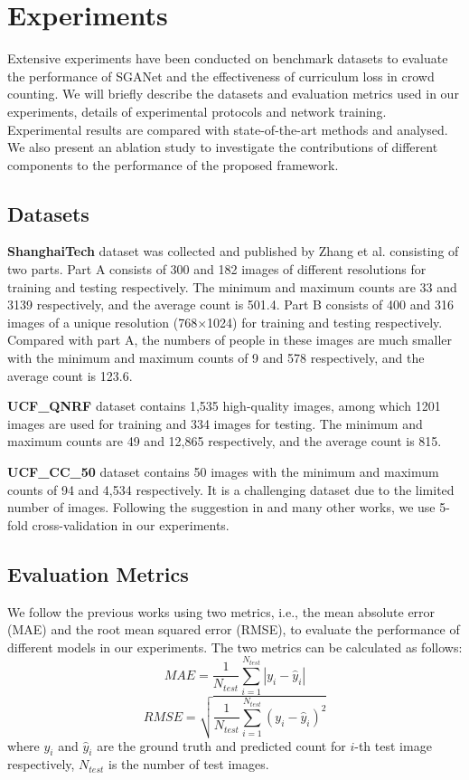 \documentclass[journal,comsoc]{IEEEtran}
\begin{document}
\section{Experiments}\label{sec:experiments}
Extensive experiments have been conducted on benchmark datasets to evaluate the performance of SGANet and the effectiveness of curriculum loss in crowd counting. We will briefly describe the datasets and evaluation metrics used in our experiments, details of experimental protocols and network training. Experimental results are compared with state-of-the-art methods and analysed. We also present an ablation study to investigate the contributions of different components to the performance of the proposed framework.

\subsection{Datasets}\label{sec:dataset}
\quad \textbf{ShanghaiTech} dataset was collected and published by Zhang et al. \cite{zhang2016single} consisting of two parts. Part A consists of 300 and 182 images of different resolutions for training and testing respectively. The minimum and maximum counts are 33 and 3139 respectively, and the average count is 501.4. Part B consists of 400 and 316 images of a unique resolution (768$\times$1024) for training and testing respectively. Compared with part A, the numbers of people in these images are much smaller with the minimum and maximum counts of 9 and 578 respectively, and the average count is 123.6.

\textbf{UCF\_QNRF} dataset \cite{idrees2018composition} contains 1,535 high-quality images, among which 1201 images are used for training and 334 images for testing. The minimum and maximum counts are 49 and 12,865 respectively, and the average count is 815.

\textbf{UCF\_CC\_50} dataset \cite{idrees2013multi} contains 50 images with the minimum and maximum counts of 94 and 4,534 respectively. It is a challenging dataset due to the limited number of images. Following the suggestion in \cite{idrees2013multi} and many other works, we use 5-fold cross-validation in our experiments. 

\subsection{Evaluation Metrics} \label{sec:evaluation}
We follow the previous works using two metrics, i.e., the mean absolute error (MAE) and the root mean squared error (RMSE), to evaluate the performance of different models in our experiments. The two metrics can be calculated as follows:
\begin{equation}
    \label{eq:mae}
    MAE = \frac{1}{N_{test}} \sum_{i=1}^{N_{test}} |y_i-\hat{y}_i|
\end{equation}
\begin{equation}
    \label{eq:rmse}
    RMSE = \sqrt{\frac{1}{N_{test}}\sum_{i=1}^{N_{test}} (y_i-\hat{y}_i)^2}
\end{equation}
where $y_i$ and $\hat{y}_i$ are the ground truth and predicted count for $i$-th test image respectively, $N_{test}$ is the number of test images.
\end{document}

